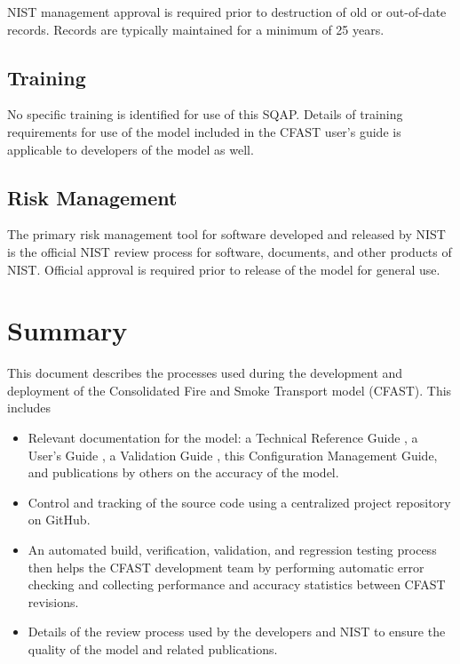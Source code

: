 \documentclass[12pt]{book}
\begin{document}
NIST management approval is required prior to destruction of old or out-of-date records. Records are typically maintained for a minimum of 25 years.

\section{Training}

No specific training is identified for use of this SQAP.  Details of training requirements for use of the model included in the CFAST user's guide is applicable to developers of the model as well.

{\section{Risk Management}

The primary risk management tool for software developed and released by NIST is the official NIST review process for software, documents, and other products of NIST. Official approval is required prior to release of the model for general use.

\chapter{Summary}

This document describes the processes used during the development and deployment of the Consolidated Fire and Smoke Transport model (CFAST). This includes

\begin{itemize}
\item Relevant documentation for the model: a Technical Reference Guide \cite{CFAST_Tech_Guide_7}, a User's Guide \cite{CFAST_Users_Guide_7}, a Validation Guide \cite{CFAST_Valid_Guide_7}, this Configuration Management Guide, and publications by others on the accuracy of the model.

\item Control and tracking of the source code using a centralized project repository on GitHub.

\item An automated build, verification, validation, and regression testing process then helps the CFAST development team by performing automatic error checking and collecting performance and accuracy statistics between CFAST revisions.

\item Details of the review process used by the developers and NIST to ensure the quality of the model and related publications.


\end{itemize}}
\end{document}
